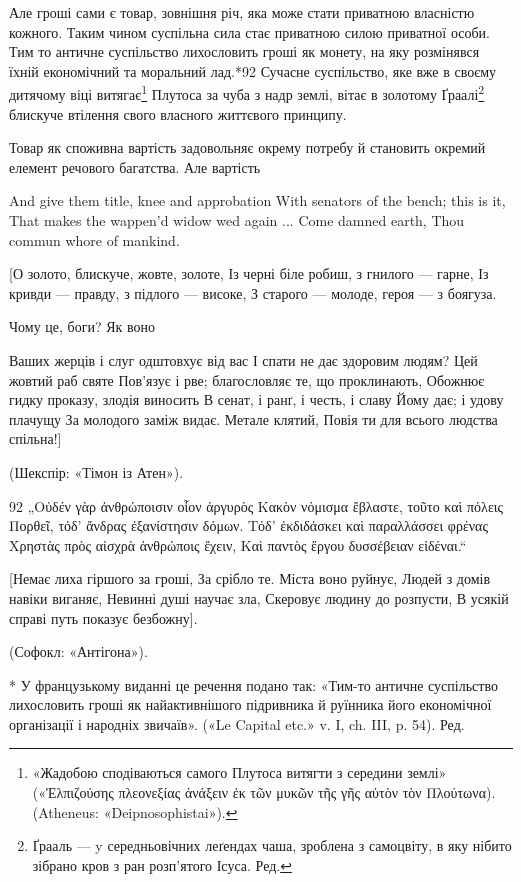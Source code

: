 Але гроші сами є товар, зовнішня річ, яка може стати приватною
власністю кожного. Таким чином суспільна сила стає приватною
силою приватної особи. Тим то античне суспільство лихословить
гроші як монету, на яку розмінявся їхній економічний та моральний
лад.*92 Сучасне суспільство, яке вже в своєму дитячому
віці витягає\footnote{
«Жадобою сподіваються самого Плутоса витягти з середини землі»
(«Ἐλπιζούσης  πλεονεξίας ἀνάξειν ἐκ τῶν μυκῶν τῆς γῆς αὐτὸν τὸν Πλούτωνα). (Atheneus:
«Deipnosophistai»).
} Плутоса за чуба з надр землі, вітає в золотому
Ґраалі\footnote*{
Ґрааль — y середньовічних леґендах чаша, зроблена з самоцвіту,
в яку нібито зібрано кров з ран розп’ятого Ісуса. Ред.
} блискуче втілення свого власного життєвого принципу.

Товар як споживна вартість задовольняє окрему потребу й
становить окремий елемент речового багатства. Але вартість

And give them title, knee and approbation
With senators of the bench; this is it,
That makes the wappen’d widow wed again
... Come damned earth,
Thou commun whore of mankind.

[О золото, блискуче, жовте, золоте,
Із черні біле робиш, з гнилого — гарне,
Із кривди — правду, з підлого — високе,
З старого — молоде, героя — з боягуза.

Чому це, боги? Як воно

Ваших жерців і слуг одштовхує від вас
І спати не дає здоровим людям?
Цей жовтий раб святе
Пов’язує і рве; благословляє те, що
проклинають,
Обожнює гидку проказу, злодія виносить
В сенат, і ранґ, і честь, і славу
Йому дає; і удову плачущу
За молодого заміж видає.
Метале клятий,
Повія ти для всього людства спільна!]

(Шекспір: «Тімон із Атен»).

92 „Οὐδέν γὰρ ἀνθρώποισιν οἷον ἀργυρὸς
Κακὸν νόμισμα ἔβλαστε, τοῦτο καὶ πόλεις
Πορθεῖ, τόδ’ ἄνδρας ἐξανίστησιν δόμων.
Τόδ’ ἐκδιδάσκει καὶ παραλλάσσει φρένας
Χρηστὰς πρὸς αἰσχρὰ ἀνθρώποις ἔχειν,
Καὶ παντὸς ἔργου δυσσέβειαν εἰδέναι.“

[Немає лиха гіршого за гроші,
За срібло те. Міста воно руйнує,
Людей з домів навіки виганяє,
Невинні душі научає зла,
Скеровує людину до розпусти,
В усякій справі путь показує безбожну].

(Софокл: «Антігона»).

* У французькому виданні це речення подано так: «Тим-то
античне
суспільство лихословить гроші як найактивнішого підривника й руїнника
його економічної організації і народніх звичаїв». («Le Capital etc.» v. I,
ch. III, p. 54). Ред.